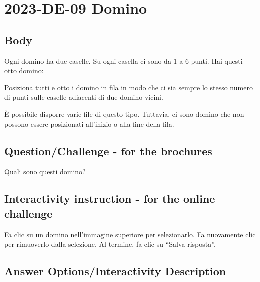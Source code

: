 \documentclass[a4paper,11pt]{report}
\newcommand{\taskGraphicsFolder}{..}
\begin{document}
\section*{\centering{} 2023-DE-09 Domino}


\subsection*{Body}

Ogni domino ha due caselle. Su ogni casella ci sono da $1$ a $6$ punti. Hai questi otto domino:

{\centering%
\par}

Posiziona tutti e otto i domino in fila in modo che ci sia sempre lo stesso numero di punti sulle caselle adiacenti di due domino vicini.

{\centering%
\raisebox{-0.5ex}{} \raisebox{-0.5ex}{}\par}

È possibile disporre varie file di questo tipo. Tuttavia, ci sono domino che non possono essere posizionati all’inizio o alla fine della fila.

{\centering%
\par}

{\em


\subsection*{Question/Challenge - for the brochures}

Quali sono questi domino?

}


\subsection*{Interactivity instruction - for the online challenge}

Fa clic su un domino nell’immagine superiore per selezionarlo. Fa nuovamente clic per rimuoverlo dalla selezione. Al termine, fa clic su \enquote{Salva risposta}.

\begingroup
\renewcommand{\arraystretch}{1.5}
\subsection*{Answer Options/Interactivity Description}
\end{document}
